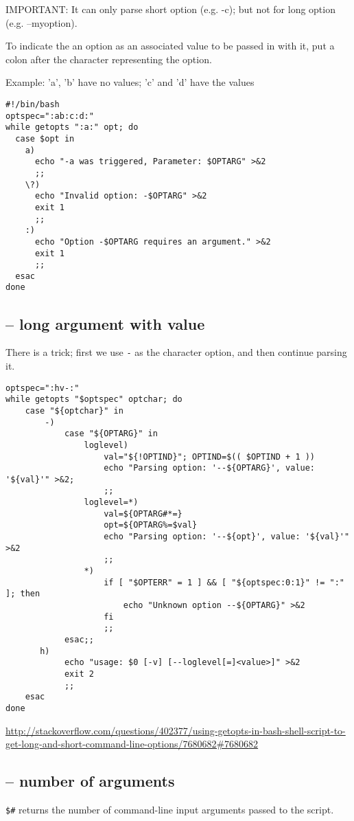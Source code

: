 IMPORTANT: It can only parse short option (e.g. -c); but not for long option
(e.g. --myoption).

To indicate the an option as an associated value to be passed in with it, put a
colon after the character representing the option.

Example: 'a', 'b' have no values; 'c' and 'd' have the values
\begin{verbatim}
#!/bin/bash
optspec=":ab:c:d:"
while getopts ":a:" opt; do
  case $opt in
    a)
      echo "-a was triggered, Parameter: $OPTARG" >&2
      ;;
    \?)
      echo "Invalid option: -$OPTARG" >&2
      exit 1
      ;;
    :)
      echo "Option -$OPTARG requires an argument." >&2
      exit 1
      ;;
  esac
done
\end{verbatim}


\subsection{-- long argument with value}

There is a trick; first we use \verb!-! as the character option, and then
continue parsing it.

\begin{verbatim}
optspec=":hv-:"
while getopts "$optspec" optchar; do
    case "${optchar}" in
        -)
            case "${OPTARG}" in
                loglevel)
                    val="${!OPTIND}"; OPTIND=$(( $OPTIND + 1 ))
                    echo "Parsing option: '--${OPTARG}', value: '${val}'" >&2;
                    ;;
                loglevel=*)
                    val=${OPTARG#*=}
                    opt=${OPTARG%=$val}
                    echo "Parsing option: '--${opt}', value: '${val}'" >&2
                    ;;
                *)
                    if [ "$OPTERR" = 1 ] && [ "${optspec:0:1}" != ":" ]; then
                        echo "Unknown option --${OPTARG}" >&2
                    fi
                    ;;
            esac;;
       h)
            echo "usage: $0 [-v] [--loglevel[=]<value>]" >&2
            exit 2
            ;;
    esac
done
\end{verbatim}
\url{http://stackoverflow.com/questions/402377/using-getopts-in-bash-shell-script-to-get-long-and-short-command-line-options/7680682#7680682}
\subsection{-- number of arguments}

\verb!$#! returns the number of command-line input arguments passed to the
script.

